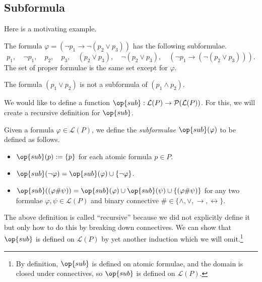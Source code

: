 \documentclass[../notes.tex]{subfiles}
\begin{document}
\subsection{Subformula}
Here is a motivating example.
\begin{example}
	The formula $\varphi=(\lnot p_1\to\lnot(p_2\lor p_3))$ has the following subformulae.
	\[p_1,\quad\lnot p_1,\quad p_2,\quad p_3,\quad(p_2\lor p_3),\quad\lnot(p_2\lor p_3),\quad(\lnot p_1\to(\lnot(p_2\lor p_3))).\]
	The set of proper formulae is the same set except for $\varphi$.
\end{example}
\begin{nex}
	The formula $(p_1\lor p_2)$ is not a subformula of $(p_1\land p_2)$.
\end{nex}
We would like to define a function $\op{sub}:\mathcal L(P)\to\mathcal P(\mathcal L(P))$. For this, we will create a recursive definition for $\op{sub}$.
\begin{definition}[Subformula]
	Given a formula $\varphi\in\mathcal L(P)$, we define the \textit{subformulae} $\op{sub}(\varphi)$ to be defined as follows.
	\begin{itemize}
		\item $\op{sub}(p):=\{p\}$ for each atomic formula $p\in P$.
		\item $\op{sub}(\lnot\varphi)=\op{sub}(\varphi)\cup\{\lnot\varphi\}$.
		\item $\op{sub}((\varphi\#\psi))=\op{sub}(\varphi)\cup\op{sub}(\psi)\cup\{(\varphi\#\psi)\}$ for any two formulae $\varphi,\psi\in\mathcal L(P)$ and binary connective $\#\in\{\land,\lor,\to,\leftrightarrow\}$.
	\end{itemize}
\end{definition}
The above definition is called ``recursive'' because we did not explicitly define it but only how to do this by breaking down connectives. We can show that $\op{sub}$ is defined on $\mathcal L(P)$ by yet another induction which we will omit.\footnote{By definition, $\op{sub}$ is defined on atomic formulae, and the domain is closed under connectives, so $\op{sub}$ is defined on $\mathcal L(P)$.}
\end{document}
